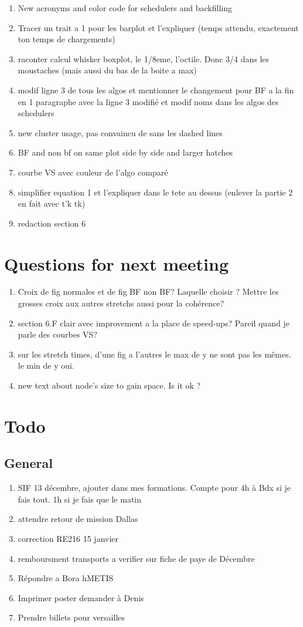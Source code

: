 \documentclass[a4paper]{article}
\begin{document}
\begin{enumerate}
		\item New acronyms and color code for schedulers and backfilling
		\item Tracer un trait a 1 pour les barplot et l'expliquer (temps attendu, exactement ton temps de chargements)
		\item raconter calcul whisker boxplot, le 1/8eme, l'octile. Donc 3/4 dans les moustaches (mais aussi du bas de la boite a max)
		\item modif ligne 3 de tous les algos et mentionner le changement pour BF a la fin en 1 paragraphe avec la ligne 3 modifié et modif noms dans les algos des schedulers
		\item new cluster usage, pas convaincu de sans les dashed lines
		\item BF and non bf on same plot side by side and larger hatches
		\item courbe VS avec couleur de l'algo comparé
		\item simplifier equation 1 et l'expliquer dans le tete au dessus (enlever la partie 2 en fait avec t'k tk)
		\item redaction section 6
	\end{enumerate}
	
\section{Questions for next meeting}
	\begin{enumerate}
		\item Croix de fig normales et de fig BF non BF? Laquelle choisir ? Mettre les grosses croix aux autres stretchs aussi pour la cohérence?
		\item section 6.F clair avec improvement a la place de speed-ups? Pareil quand je parle des courbes VS?
		\item sur les stretch times, d'une fig a l'autres le max de y ne sont pas les mêmes. le min de y oui.
		\item new text about node's size to gain space. Is it ok ?
	\end{enumerate}
	
\section{Todo}
	\subsection{General}
		\begin{enumerate}
			\item SIF 13 décembre, ajouter dans mes formations. Compte pour 4h à Bdx si je fais tout. 1h si je fais que le matin
			\item attendre retour de mission Dallas
			\item correction RE216 15 janvier
			\item remboursment transports a verifier sur fiche de paye de Décembre
			\item Répondre a Bora hMETIS
			\item Imprimer poster demander à Denis
			\item Prendre billets pour versailles
		\end{enumerate}
\end{document}
